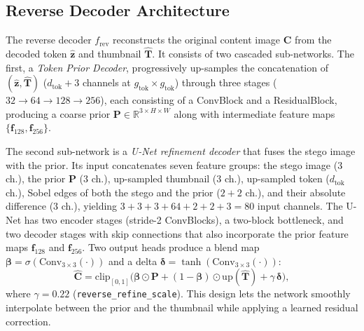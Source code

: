 \documentclass[runningheads]{llncs}
\begin{document}
\subsection{Reverse Decoder Architecture}
\label{sec:revdec}
The reverse decoder $f_{\text{rev}}$ reconstructs the original content image $\mathbf{C}$ from the decoded token $\hat{\mathbf{z}}$ and thumbnail $\hat{\mathbf{T}}$. It consists of two cascaded sub-networks. The first, a \emph{Token Prior Decoder}, progressively up-samples the concatenation of $(\hat{\mathbf{z}},\hat{\mathbf{T}})$ ($d_{\text{tok}}{+}3$ channels at $g_{\text{tok}}\!\times\!g_{\text{tok}}$) through three stages ($32\!\to\!64\!\to\!128\!\to\!256$), each consisting of a ConvBlock and a ResidualBlock, producing a coarse prior $\mathbf{P}\!\in\!\mathbb{R}^{3\times H\times W}$ along with intermediate feature maps $\{\mathbf{f}_{128},\mathbf{f}_{256}\}$.

The second sub-network is a \emph{U-Net refinement decoder} that fuses the stego image with the prior. Its input concatenates seven feature groups: the stego image ($3$ ch.), the prior $\mathbf{P}$ ($3$ ch.), up-sampled thumbnail ($3$ ch.), up-sampled token ($d_{\text{tok}}$ ch.), Sobel edges of both the stego and the prior ($2{+}2$ ch.), and their absolute difference ($3$ ch.), yielding $3{+}3{+}3{+}64{+}2{+}2{+}3=80$ input channels. The U-Net has two encoder stages (stride-2 ConvBlocks), a two-block bottleneck, and two decoder stages with skip connections that also incorporate the prior feature maps $\mathbf{f}_{128}$ and $\mathbf{f}_{256}$. Two output heads produce a blend map $\boldsymbol{\beta}=\sigma(\text{Conv}_{3\times3}(\cdot))$ and a delta $\boldsymbol{\delta}=\tanh(\text{Conv}_{3\times3}(\cdot))$:
\begin{equation}
    \hat{\mathbf{C}} = \mathrm{clip}_{[0,1]}\!\Big(\boldsymbol{\beta}\odot\mathbf{P} + (1{-}\boldsymbol{\beta})\odot\mathrm{up}(\hat{\mathbf{T}}) + \gamma\,\boldsymbol{\delta}\Big),
    \label{eq:revdec}
\end{equation}
where $\gamma\!=\!0.22$ (\texttt{reverse\_refine\_scale}). This design lets the network smoothly interpolate between the prior and the thumbnail while applying a learned residual correction.
\end{document}
